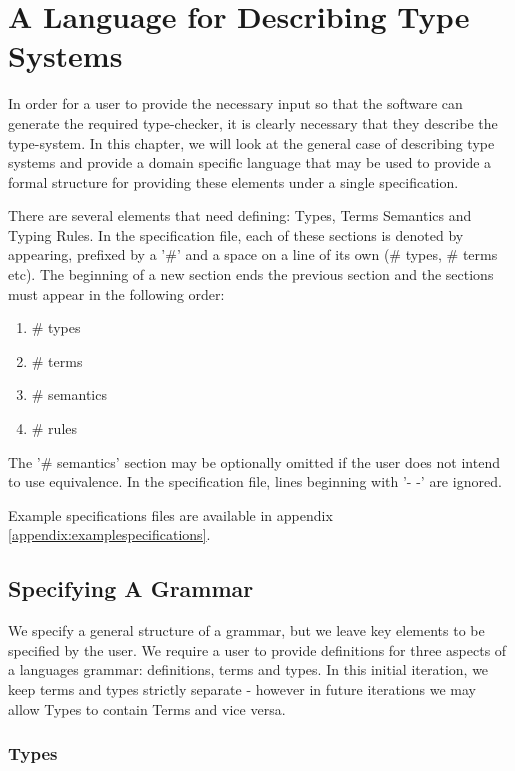 \chapter{A Language for Describing Type Systems}

In order for a user to provide the necessary input so that the
software can generate the required type-checker, it is clearly
necessary that they describe the type-system. In this chapter, we will
look at the general case of describing type systems and provide a
domain specific language that may be used to provide a formal
structure for providing these elements under a single specification.

There are several elements that need defining: Types, Terms Semantics
and Typing Rules. In the specification file, each of these sections is
denoted by appearing, prefixed by a '\#' and a space on a line of its
own (\# types, \# terms etc). The beginning of a new section ends the
previous section and the sections must appear in the following order:

\begin{enumerate}
  \item \# types
  \item \# terms
  \item \# semantics
  \item \# rules
\end{enumerate}

The '\# semantics' section may be optionally omitted if the user does
not intend to use equivalence. In the specification file, lines beginning
with '- -' are ignored. 

Example specifications files are available in appendix \ref{appendix:examplespecifications}.

\section{Specifying A Grammar}

We specify a general structure of a grammar, but we leave key elements
to be specified by the user. We require a user to provide definitions
for three aspects of a languages grammar: definitions, terms and
types. In this initial iteration, we keep terms and types strictly
separate - however in future iterations we may allow Types to contain
Terms and vice versa. 

\subsection{Types}

